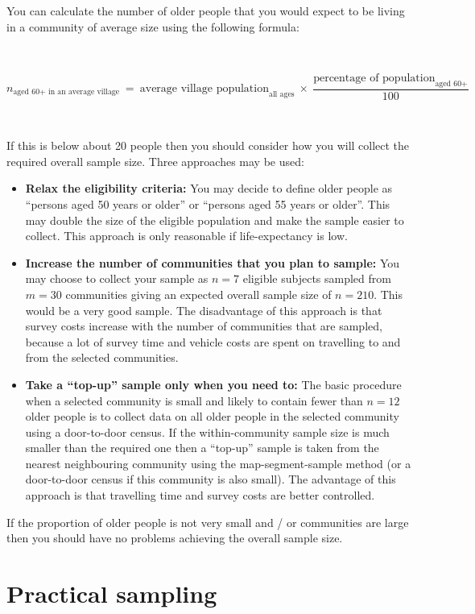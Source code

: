 \documentclass[12pt,a4paper]{book}
\begin{document}
You can calculate the number of older people that you would expect to be living in a community of average size using the following formula:

~

\[n_{\text{aged 60+ in an average village}} ~ = ~ \text{average village population}_{\text{all ages}} ~ \times ~ \frac{\text{percentage of population}_{\text{aged 60+}}}{100}\]

~

If this is below about 20 people then you should consider how you will collect the required overall sample size. Three approaches may be used:

\begin{itemize}
\item
  \textbf{Relax the eligibility criteria:} You may decide to define older people as ``persons aged 50 years or older'' or ``persons aged 55 years or older''. This may double the size of the eligible population and make the sample easier to collect. This approach is only reasonable if life-expectancy is low.
\item
  \textbf{Increase the number of communities that you plan to sample:} You may choose to collect your sample as \(n = 7\) eligible subjects sampled from \(m = 30\) communities giving an expected overall sample size of \(n = 210\). This would be a very good sample. The disadvantage of this approach is that survey costs increase with the number of communities that are sampled, because a lot of survey time and vehicle costs are spent on travelling to and from the selected communities.
\item
  \textbf{Take a ``top-up'' sample only when you need to:} The basic procedure when a selected community is small and likely to contain fewer than \(n = 12\) older people is to collect data on all older people in the selected community using a door-to-door census. If the within-community sample size is much smaller than the required one then a ``top-up'' sample is taken from the nearest neighbouring community using the map-segment-sample method (or a door-to-door census if this community is also small). The advantage of this approach is that travelling time and survey costs are better controlled.
\end{itemize}

If the proportion of older people is not very small and / or communities are large then you should have no problems achieving the overall sample size.

\hypertarget{practical-sampling}{%
\section{Practical sampling}\label{practical-sampling}}
\end{document}
